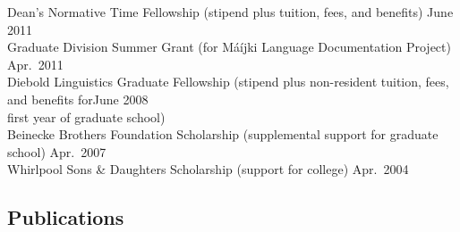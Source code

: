 \documentclass[11pt]{article}
\begin{document}
\noindent Dean's Normative Time Fellowship (stipend plus tuition, fees, and benefits) \hfill June 2011\vspace{-8pt} \\

\noindent Graduate Division Summer Grant (for M\'a\'ij\textbari ki Language Documentation Project) \hfill Apr.~2011\vspace{-8pt} \\

\noindent Diebold Linguistics Graduate Fellowship (stipend plus non-resident tuition, fees, and benefits for\hfill June 2008 \\ 
\mbox{}\hspace{0.45in}first year of graduate school)\vspace{-8pt} \\

\noindent Beinecke Brothers Foundation Scholarship (supplemental support for graduate school) \hfill Apr.~2007\vspace{-8pt} \\ 

\noindent Whirlpool Sons \& Daughters Scholarship (support for college) \hfill Apr.~2004

\subsection*{Publications}
\end{document}
